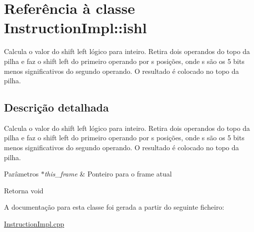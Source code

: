 \hypertarget{class_instruction_impl_1_1ishl}{}\section{Referência à classe Instruction\+Impl\+:\+:ishl}
\label{class_instruction_impl_1_1ishl}


Calcula o valor do shift left lógico para inteiro. Retira dois operandos do topo da pilha e faz o shift left do primeiro operando por s posições, onde s são os 5 bits menos significativos do segundo operando. O resultado é colocado no topo da pilha.  




\subsection{Descrição detalhada}
Calcula o valor do shift left lógico para inteiro. Retira dois operandos do topo da pilha e faz o shift left do primeiro operando por s posições, onde s são os 5 bits menos significativos do segundo operando. O resultado é colocado no topo da pilha. 


\begin{DoxyParams}{Parâmetros}
{\em $\ast$this\+\_\+frame} & Ponteiro para o frame atual \\
\hline
\end{DoxyParams}
\begin{DoxyReturn}{Retorna}
void 
\end{DoxyReturn}


A documentação para esta classe foi gerada a partir do seguinte ficheiro\+:\begin{DoxyCompactItemize}
\item 
\hyperlink{_instruction_impl_8cpp}{Instruction\+Impl.\+cpp}\end{DoxyCompactItemize}
